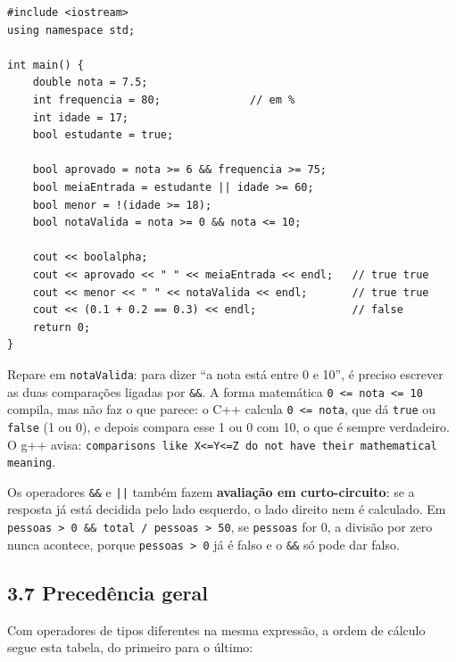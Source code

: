\begin{codigo}
\begin{Verbatim}[breaklines=true, breaksymbolleft={}, fontsize=\footnotesize]
#include <iostream>
using namespace std;

int main() {
    double nota = 7.5;
    int frequencia = 80;              // em %
    int idade = 17;
    bool estudante = true;

    bool aprovado = nota >= 6 && frequencia >= 75;
    bool meiaEntrada = estudante || idade >= 60;
    bool menor = !(idade >= 18);
    bool notaValida = nota >= 0 && nota <= 10;

    cout << boolalpha;
    cout << aprovado << " " << meiaEntrada << endl;   // true true
    cout << menor << " " << notaValida << endl;       // true true
    cout << (0.1 + 0.2 == 0.3) << endl;               // false
    return 0;
}
\end{Verbatim}
\end{codigo}

Repare em \texttt{notaValida}: para dizer ``a nota está entre 0 e 10'', é preciso escrever as duas comparações ligadas por \texttt{\&\&}. A forma matemática \texttt{0 <= nota <= 10} compila, mas não faz o que parece: o C++ calcula \texttt{0 <= nota}, que dá \texttt{true} ou \texttt{false} (1 ou 0), e depois compara esse 1 ou 0 com 10, o que é sempre verdadeiro. O g++ avisa: \texttt{comparisons like \textquotesingle{}X<=Y<=Z\textquotesingle{} do not have their mathematical meaning}.

Os operadores \texttt{\&\&} e \texttt{||} também fazem \textbf{avaliação em curto-circuito}: se a resposta já está decidida pelo lado esquerdo, o lado direito nem é calculado. Em \texttt{pessoas > 0 \&\& total / pessoas > 50}, se \texttt{pessoas} for 0, a divisão por zero nunca acontece, porque \texttt{pessoas > 0} já é falso e o \texttt{\&\&} só pode dar falso.

\subsection{3.7 Precedência geral}

Com operadores de tipos diferentes na mesma expressão, a ordem de cálculo segue esta tabela, do primeiro para o último:


